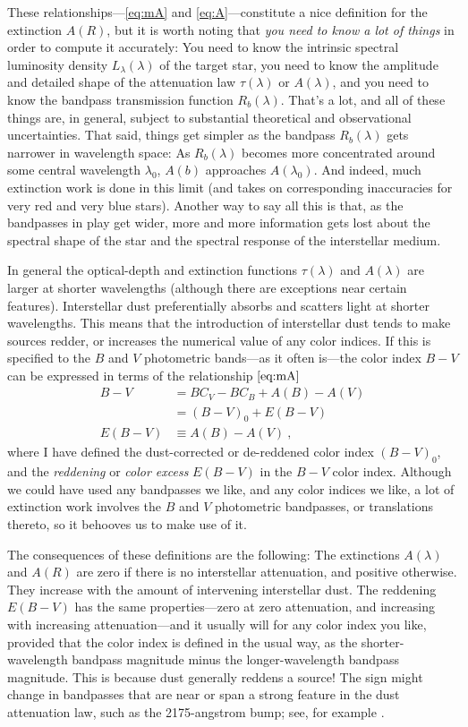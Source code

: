 \documentclass[10pt]{article}
\begin{document}
These relationships---\eqref{eq:mA} and \eqref{eq:A}---constitute a nice definition for the extinction $A(R)$, but it is worth noting that \emph{you need to know a lot of things} in order to compute it accurately:
You need to know the intrinsic spectral luminosity density $L_\lambda(\lambda)$ of the target star, you need to know the amplitude and detailed shape of the attenuation law $\tau(\lambda)$ or $A(\lambda)$, and you need to know the bandpass transmission function $R_b(\lambda)$.
That's a lot, and all of these things are, in general, subject to substantial theoretical and observational uncertainties.
That said, things get simpler as the bandpass $R_b(\lambda)$ gets narrower in wavelength space:
As $R_b(\lambda)$ becomes more concentrated around some central wavelength $\lambda_0$, $A(b)$ approaches $A(\lambda_0)$.
And indeed, much extinction work is done in this limit (and takes on corresponding inaccuracies for very red and very blue stars).
Another way to say all this is that, as the bandpasses in play get wider, more and more information gets lost about the spectral shape of the star and the spectral response of the interstellar medium.

In general the optical-depth and extinction functions $\tau(\lambda)$ and $A(\lambda)$ are larger at shorter wavelengths (although there are exceptions near certain features).
Interstellar dust preferentially absorbs and scatters light at shorter wavelengths.
This means that the introduction of interstellar dust tends to make sources redder, or increases the numerical value of any color indices.
If this is specified to the $B$ and $V$ photometric bands---as it often is---the color index $B-V$ can be expressed in terms of the relationship $\eqref{eq:mA}$
\begin{align}
    B - V &= BC_V - BC_B + A(B) - A(V)\\
          &= (B - V)_0 + E(B - V)\\
    E(B - V) &\equiv A(B) - A(V) ~,
\end{align}
where I have defined the dust-corrected or de-reddened color index $(B-V)_0$,
and the \emph{reddening} or \emph{color excess} $E(B-V)$ in the $B-V$ color index.
Although we could have used any bandpasses we like, and any color indices we like,
a lot of extinction work involves the $B$ and $V$ photometric bandpasses, or translations thereto, so it behooves us to make use of it.

The consequences of these definitions are the following:
The extinctions $A(\lambda)$ and $A(R)$ are zero if there is no interstellar attenuation, and positive otherwise.
They increase with the amount of intervening interstellar dust.
The reddening $E(B-V)$ has the same properties---zero at zero attenuation, and increasing with increasing attenuation---and it usually will for any color index you like, provided that the color index is defined in the usual way, as the shorter-wavelength bandpass magnitude minus the longer-wavelength bandpass magnitude.
This is because dust generally reddens a source!
The sign might change in bandpasses that are near or span a strong feature in the dust attenuation law, such as the 2175-angstrom bump; see, for example \cite{extinction}.
\end{document}
